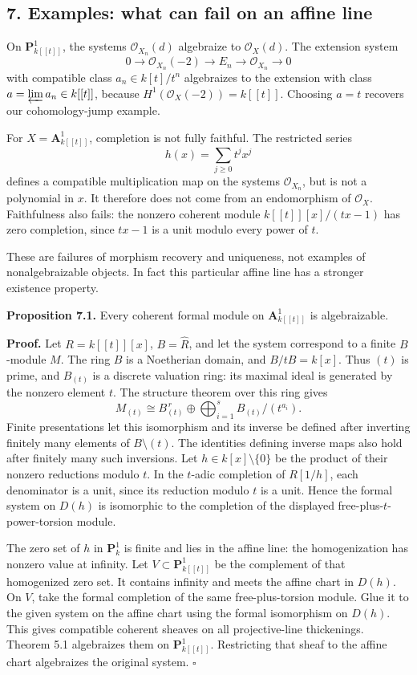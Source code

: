 \documentclass[11pt]{article}
\begin{document}
\subsection{7. Examples: what can fail on an affine
line}\label{examples-what-can-fail-on-an-affine-line}

On \(\mathbf P^1_{k[[t]]}\), the systems \(\mathcal O_{X_n}(d)\)
algebraize to \(\mathcal O_X(d)\). The extension system \[
0\to\mathcal O_{X_n}(-2)\to E_n\to\mathcal O_{X_n}\to0
\] with compatible class \(a_n\in k[t]/t^n\) algebraizes to the
extension with class \(a=\varprojlim a_n\in k[[t]]\), because
\(H^1(\mathcal O_X(-2))=k[[t]]\). Choosing \(a=t\) recovers our
cohomology-jump example.

For \(X=\mathbf A^1_{k[[t]]}\), completion is not fully faithful. The
restricted series \[
h(x)=\sum_{j\geq0}t^jx^j
\] defines a compatible multiplication map on the systems
\(\mathcal O_{X_n}\), but is not a polynomial in \(x\). It therefore
does not come from an endomorphism of \(\mathcal O_X\). Faithfulness
also fails: the nonzero coherent module \(k[[t]][x]/(tx-1)\) has zero
completion, since \(tx-1\) is a unit modulo every power of \(t\).

These are failures of morphism recovery and uniqueness, not examples of
nonalgebraizable objects. In fact this particular affine line has a
stronger existence property.

\textbf{Proposition 7.1.} Every coherent formal module on
\(\mathbf A^1_{k[[t]]}\) is algebraizable.

\textbf{Proof.} Let \(R=k[[t]][x]\), \(B=\widehat R\), and let the
system correspond to a finite \(B\)-module \(M\). The ring \(B\) is a
Noetherian domain, and \(B/tB=k[x]\). Thus \((t)\) is prime, and
\(B_{(t)}\) is a discrete valuation ring: its maximal ideal is generated
by the nonzero element \(t\). The structure theorem over this ring gives
\[
M_{(t)}\cong B_{(t)}^{\,r}\oplus\bigoplus_{i=1}^s B_{(t)}/(t^{a_i}).
\] Finite presentations let this isomorphism and its inverse be defined
after inverting finitely many elements of \(B\setminus(t)\). The
identities defining inverse maps also hold after finitely many such
inversions. Let \(h\in k[x]\setminus\{0\}\) be the product of their
nonzero reductions modulo \(t\). In the \(t\)-adic completion of
\(R[1/h]\), each denominator is a unit, since its reduction modulo \(t\)
is a unit. Hence the formal system on \(D(h)\) is isomorphic to the
completion of the displayed free-plus-\(t\)-power-torsion module.

The zero set of \(h\) in \(\mathbf P^1_k\) is finite and lies in the
affine line: the homogenization has nonzero value at infinity. Let
\(V\subset\mathbf P^1_{k[[t]]}\) be the complement of that homogenized
zero set. It contains infinity and meets the affine chart in \(D(h)\).
On \(V\), take the formal completion of the same free-plus-torsion
module. Glue it to the given system on the affine chart using the formal
isomorphism on \(D(h)\). This gives compatible coherent sheaves on all
projective-line thickenings. Theorem 5.1 algebraizes them on
\(\mathbf P^1_{k[[t]]}\). Restricting that sheaf to the affine chart
algebraizes the original system. \(\square\)
\end{document}
